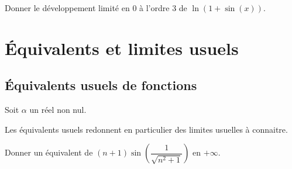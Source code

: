 \documentclass[a4paper,10pt]{report}
\begin{document}
\begin{exa} Donner le développement limité en $0$ à l'ordre $3$ de $\ln(1+\sin(x)).$
\end{exa}



\section{Équivalents et limites usuels}
\subsection{Équivalents usuels de fonctions}

\noindent Soit $\alpha$ un réel non nul.

\bigskip

 
 \bigskip
 
 \noindent Les équivalents usuels redonnent en particulier des limites usuelles à connaitre. 

\medskip
 \begin{exa} Donner un équivalent de $(n+1) \sin \left(\dfrac{1}{\sqrt{n^2+1}} \right)$ en $+ \infty$.
 \end{exa}
\end{document}
